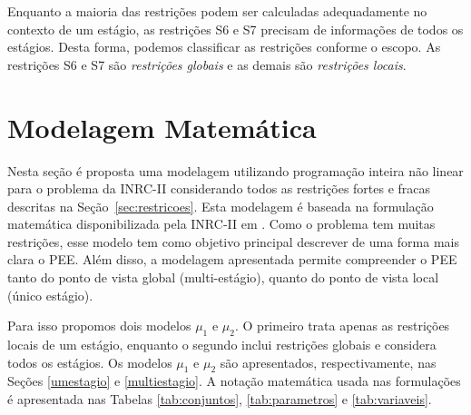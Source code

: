 \documentclass[cic,tc, twoside]{iiufrgs}
\begin{document}
Enquanto a maioria das restrições podem ser calculadas adequadamente no contexto de um estágio, as restrições S6 e S7 precisam de informações de todos os estágios. Desta forma, podemos classificar as restrições conforme o escopo. As restrições S6 e S7 são \emph{restrições globais} e as demais são \emph{restrições locais}.

\section{Modelagem Matemática} \label{sec:modelo}

Nesta seção é proposta uma modelagem utilizando programação inteira não linear para o problema da INRC-II considerando todos as restrições fortes e fracas descritas na Seção~\ref{sec:restricoes}. 
Esta modelagem é baseada na formulação matemática disponibilizada pela INRC-II em \cite{ceschia2015model}. Como o problema tem muitas restrições, esse modelo tem como objetivo principal descrever de uma forma mais clara o PEE. 
Além disso, a modelagem apresentada permite compreender o PEE tanto do ponto de vista global (multi-estágio), quanto do ponto de vista local (único estágio). 

Para isso propomos dois modelos $\mu_1$ e $\mu_2$. O primeiro trata apenas as restrições locais de um estágio, enquanto o segundo inclui restrições globais e considera todos os estágios. 
Os modelos $\mu_1$ e $\mu_2$ são apresentados, respectivamente, nas Seções \ref{umestagio} e \ref{multiestagio}. A notação matemática usada nas formulações é apresentada nas Tabelas \ref{tab:conjuntos}, \ref{tab:parametros} e \ref{tab:variaveis}.
\end{document}
